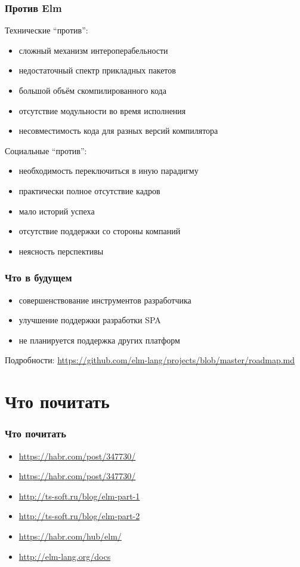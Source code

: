 \documentclass[11pt,aspectratio=169]{beamer}
\begin{document}
\begin{frame}
\frametitle{Против Elm}
Технические ``против'':
\begin{itemize}
	\item сложный механизм интероперабельности
	\item недостаточный спектр прикладных пакетов
	\item большой объём скомпилированного кода
	\item отсутствие модульности во время исполнения
	\item несовместимость кода для разных версий компилятора
\end{itemize}

Социальные ``против'':
\begin{itemize}
	\item необходимость переключиться в иную парадигму
	\item практически полное отсутствие кадров
	\item мало историй успеха
	\item отсутствие поддержки со стороны компаний
	\item неясность перспективы
\end{itemize}
\end{frame}

\begin{frame}
\frametitle{Что в будущем}

\begin{itemize}
	\item совершенствование инструментов разработчика
	\item улучшение поддержки разработки SPA
	\item не планируется поддержка других платформ
\end{itemize}

Подробности: \url{https://github.com/elm-lang/projects/blob/master/roadmap.md}

\end{frame}

\section{Что почитать}

\begin{frame}
\frametitle{Что почитать}
\begin{itemize}
	\item \url{https://habr.com/post/347730/}
	\item \url{https://habr.com/post/347730/}
	\item \url{http://ts-soft.ru/blog/elm-part-1}
	\item \url{http://ts-soft.ru/blog/elm-part-2}
	\item \url{https://habr.com/hub/elm/}
	\item \url{http://elm-lang.org/docs}
\end{itemize}
\end{frame}
\end{document}
